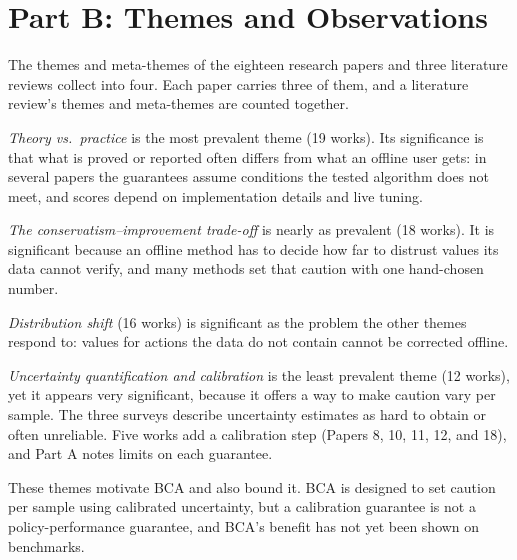 \documentclass[11pt]{article}
\begin{document}
\section*{Part B: Themes and Observations}

The themes and meta-themes of the eighteen research papers and three literature reviews collect into four. Each paper carries three of them, and a literature review's themes and meta-themes are counted together.

\emph{Theory vs.\ practice} is the most prevalent theme (19 works). Its significance is that what is proved or reported often differs from what an offline user gets: in several papers the guarantees assume conditions the tested algorithm does not meet, and scores depend on implementation details and live tuning.

\emph{The conservatism--improvement trade-off} is nearly as prevalent (18 works). It is significant because an offline method has to decide how far to distrust values its data cannot verify, and many methods set that caution with one hand-chosen number.

\emph{Distribution shift} (16 works) is significant as the problem the other themes respond to: values for actions the data do not contain cannot be corrected offline.

\emph{Uncertainty quantification and calibration} is the least prevalent theme (12 works), yet it appears very significant, because it offers a way to make caution vary per sample. The three surveys describe uncertainty estimates as hard to obtain or often unreliable. Five works add a calibration step (Papers 8, 10, 11, 12, and 18), and Part A notes limits on each guarantee.

These themes motivate BCA and also bound it. BCA is designed to set caution per sample using calibrated uncertainty, but a calibration guarantee is not a policy-performance guarantee, and BCA's benefit has not yet been shown on benchmarks.
\end{document}
